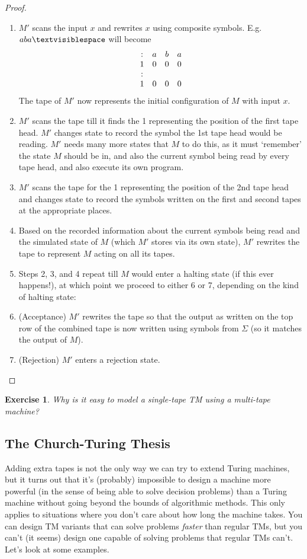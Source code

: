 \documentclass{article}
\theoremstyle{plain}
\newtheorem{exercise}[theorem]{Exercise}{\bfseries}{\upshape}
\theoremstyle{definition}
\newcommand{\tvs}{\textvisiblespace}
\begin{document}
\begin{proof}
\begin{enumerate}
\item $M'$ scans the input $x$ and rewrites $x$ using composite symbols. E.g. $aba\tvs$ will become 
\[ \begin{array}{cccc}
: & a & b & a  \\
1 & 0 & 0 & 0 \\
: & \tvs & \tvs & \tvs  \\
1 & 0 & 0 & 0 
\end{array} \] 
The tape of  $M'$ now represents the initial configuration of $M$ with input $x$. 
\item $M'$ scans the tape till it finds the 1 representing the position of the first tape head. $M'$ changes state to record the symbol the 1st tape head would be reading. $M'$ needs many more states that $M$ to do this, as it must `remember' the state $M$ should be in, and also the current symbol being read by every tape head, and also execute its own program.
\item $M'$ scans the tape for the 1 representing the position of the 2nd tape head and changes state to record the symbols written on the first and second tapes at the appropriate places. 
\item Based on the recorded information about the current symbols being read and the simulated state of $M$ (which $M'$ stores via its own state), $M'$ rewrites the tape to represent $M$ acting on all its tapes.
\item Steps 2, 3, and 4 repeat till $M$ would enter a halting state (if this ever happens!), at which point we proceed to either 6 or 7, depending on the kind of halting state:
\item (Acceptance) $M'$ rewrites the tape so that the output as written on the top row of the combined tape is now written using symbols from $\Sigma$ (so it matches the output of $M$). 
\item (Rejection) $M'$ enters a rejection state.
\end{enumerate}     
\end{proof}

\begin{exercise}
Why is it easy to model a single-tape TM using a multi-tape machine?
\end{exercise}
     


\subsection{The Church-Turing Thesis}
Adding extra tapes is not the only way we can try to extend Turing machines, but it turns out that it's (probably) impossible to design a machine more powerful (in the sense of being able to solve decision problems) than a Turing machine without going beyond the bounds of algorithmic methods. This only applies to situations where you don't care about how long the machine takes. You can design TM variants that can solve problems \emph{faster} than regular TMs, but you can't (it seems) design one capable of solving problems that regular TMs can't. Let's look at some examples.
\end{document}
